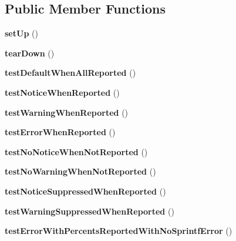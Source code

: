 \subsection*{Public Member Functions}
\begin{DoxyCompactItemize}
\item 
\hypertarget{class_test_of_errors_a3ad42ad520e81af94289f8e4e6477bbd}{
{\bfseries setUp} ()}
\label{class_test_of_errors_a3ad42ad520e81af94289f8e4e6477bbd}

\item 
\hypertarget{class_test_of_errors_ad2769342d46410abd20ba766b242bb91}{
{\bfseries tearDown} ()}
\label{class_test_of_errors_ad2769342d46410abd20ba766b242bb91}

\item 
\hypertarget{class_test_of_errors_a10abdd9ca2f12bec26f75bf4b1c7c1a5}{
{\bfseries testDefaultWhenAllReported} ()}
\label{class_test_of_errors_a10abdd9ca2f12bec26f75bf4b1c7c1a5}

\item 
\hypertarget{class_test_of_errors_a06d1cc728b9526baec9d2aa9970b716b}{
{\bfseries testNoticeWhenReported} ()}
\label{class_test_of_errors_a06d1cc728b9526baec9d2aa9970b716b}

\item 
\hypertarget{class_test_of_errors_a71bc7eb74b5e2546d1f8af52660219c4}{
{\bfseries testWarningWhenReported} ()}
\label{class_test_of_errors_a71bc7eb74b5e2546d1f8af52660219c4}

\item 
\hypertarget{class_test_of_errors_a9e5585f0095741cb8cac29a65a72ad28}{
{\bfseries testErrorWhenReported} ()}
\label{class_test_of_errors_a9e5585f0095741cb8cac29a65a72ad28}

\item 
\hypertarget{class_test_of_errors_aef40434cd579ed0d1bf3d827b9f24758}{
{\bfseries testNoNoticeWhenNotReported} ()}
\label{class_test_of_errors_aef40434cd579ed0d1bf3d827b9f24758}

\item 
\hypertarget{class_test_of_errors_a4d60140cf36b81921882aa396df1ce56}{
{\bfseries testNoWarningWhenNotReported} ()}
\label{class_test_of_errors_a4d60140cf36b81921882aa396df1ce56}

\item 
\hypertarget{class_test_of_errors_aff4f0768f8bd0051e437465ce1ef08df}{
{\bfseries testNoticeSuppressedWhenReported} ()}
\label{class_test_of_errors_aff4f0768f8bd0051e437465ce1ef08df}

\item 
\hypertarget{class_test_of_errors_aed3dfe0a4b9b41e7203ceccafcb68b1b}{
{\bfseries testWarningSuppressedWhenReported} ()}
\label{class_test_of_errors_aed3dfe0a4b9b41e7203ceccafcb68b1b}

\item 
\hypertarget{class_test_of_errors_a503a973995ec06a46f2a56522a3358cf}{
{\bfseries testErrorWithPercentsReportedWithNoSprintfError} ()}
\label{class_test_of_errors_a503a973995ec06a46f2a56522a3358cf}

\end{DoxyCompactItemize}
